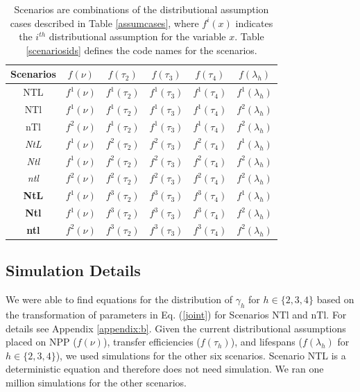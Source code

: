 \documentclass[oneside,12pt,final]{sty/ucthesis-CA2012}
\begin{document}
\begin{mainmatter}
\begin{table}[H]
\centering
\caption{Scenarios are combinations of the distributional assumption cases described in Table \ref{assumcases}, where $f^i(x)$ indicates the $i^{th}$ distributional assumption for the variable $x$. Table \ref{scenariosids} defines the code names for the scenarios. }
\begin{tabular}{|c|c|c|c|c|c|}
  \hline \small
   Scenarios & $f(\nu)$ & $f(\tau_2)$ & $f(\tau_3)$ & $f(\tau_4)$ & $f(\lambda_h)$  \\ 
  \hline
  NTL & $f^1(\nu)$ & $f^1(\tau_2)$ & $f^1(\tau_3)$ & $f^1(\tau_4)$ & $f^1(\lambda_h)$ \\
  NTl & $f^1(\nu)$ & $f^1(\tau_2)$ & $f^1(\tau_3)$ & $f^1(\tau_4)$ & $f^2(\lambda_h)$ \\
  nTl & $f^2(\nu)$ & $f^1(\tau_2)$ & $f^1(\tau_3)$ & $f^1(\tau_4)$ & $f^2(\lambda_h)$ \\   
  \textit{NtL} & $f^1(\nu)$ & $f^2(\tau_2)$ & $f^2(\tau_3)$ & $f^2(\tau_4)$ & $f^1(\lambda_h)$ \\
  \textit{Ntl} & $f^1(\nu)$ & $f^2(\tau_2)$ & $f^2(\tau_3)$ & $f^2(\tau_4)$ & $f^2(\lambda_h)$ \\ 
  \textit{ntl} & $f^2(\nu)$ & $f^2(\tau_2)$ & $f^2(\tau_3)$ & $f^2(\tau_4)$ & $f^2(\lambda_h)$ \\
  \textbf{NtL} & $f^1(\nu)$ & $f^3(\tau_2)$ & $f^3(\tau_3)$ & $f^3(\tau_4)$ & $f^1(\lambda_h)$ \\
  \textbf{Ntl} & $f^1(\nu)$ & $f^3(\tau_2)$ & $f^3(\tau_3)$ & $f^3(\tau_4)$ & $f^2(\lambda_h)$ \\
  \textbf{ntl} & $f^2(\nu)$ & $f^3(\tau_2)$ & $f^3(\tau_3)$ & $f^3(\tau_4)$ & $f^2(\lambda_h)$ \\
  \hline
\end{tabular} 
\label{scenarios}
\end{table}

\subsection*{Simulation Details}
We were able to find equations for the distribution of $\gamma_h$ for $h \in \{2, 3, 4\}$ based on the transformation of parameters in Eq. (\ref{joint}) for Scenarios NTl and nTl. For details see Appendix \ref{appendix:b}. Given the current distributional assumptions placed on NPP ($f(\nu)$), transfer efficiencies ($f(\tau_h)$), and lifespans ($f(\lambda_h)$ for $h \in \{2, 3, 4\}$), we used simulations for the other six scenarios. Scenario NTL is a deterministic equation and therefore does not need simulation. We ran one million simulations for the other scenarios. 


\end{mainmatter}
\end{document}
